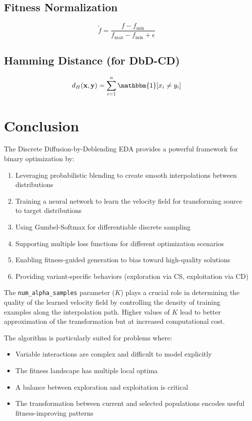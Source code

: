 \documentclass[11pt,a4paper]{article}
\newcommand{\vx}{\mathbf{x}}
\newcommand{\vy}{\mathbf{y}}
\begin{document}
\subsection{Fitness Normalization}
\begin{equation}
    \tilde{f} = \frac{f - f_{\min}}{f_{\max} - f_{\min} + \epsilon}
\end{equation}

\subsection{Hamming Distance (for DbD-CD)}
\begin{equation}
    d_H(\vx, \vy) = \sum_{i=1}^{n} \mathbbm{1}[x_i \neq y_i]
\end{equation}

\section{Conclusion}

The Discrete Diffusion-by-Deblending EDA provides a powerful framework for binary optimization by:

\begin{enumerate}
    \item Leveraging probabilistic blending to create smooth interpolations between distributions
    \item Training a neural network to learn the velocity field for transforming source to target distributions
    \item Using Gumbel-Softmax for differentiable discrete sampling
    \item Supporting multiple loss functions for different optimization scenarios
    \item Enabling fitness-guided generation to bias toward high-quality solutions
    \item Providing variant-specific behaviors (exploration via CS, exploitation via CD)
\end{enumerate}

The \texttt{num\_alpha\_samples} parameter ($K$) plays a crucial role in determining the quality of the learned velocity field by controlling the density of training examples along the interpolation path. Higher values of $K$ lead to better approximation of the transformation but at increased computational cost.

The algorithm is particularly suited for problems where:
\begin{itemize}
    \item Variable interactions are complex and difficult to model explicitly
    \item The fitness landscape has multiple local optima
    \item A balance between exploration and exploitation is critical
    \item The transformation between current and selected populations encodes useful fitness-improving patterns
\end{itemize}
\end{document}
